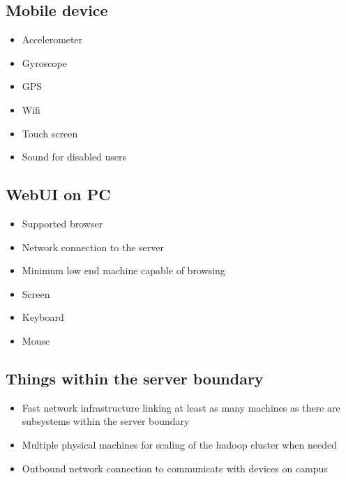 \subsection{Mobile device}
\begin{itemize}
	\item Accelerometer
	\item Gyroscope 
	\item GPS
	\item Wifi 
	\item Touch screen 
	\item Sound for disabled users
\end{itemize}

\subsection{WebUI on PC}
\begin{itemize}
	\item Supported browser
	\item Network connection to the server
  \item Minimum low end machine capable of browsing
	\item Screen
	\item Keyboard
	\item Mouse
\end{itemize}

\subsection{Things within the server boundary}
\begin{itemize}
	\item Fast network infrastructure linking at least as many machines as there are subsystems within the server boundary
	\item Multiple physical machines for scaling of the hadoop cluster when needed
  \item Outbound network connection to communicate with devices on campus
\end{itemize}

